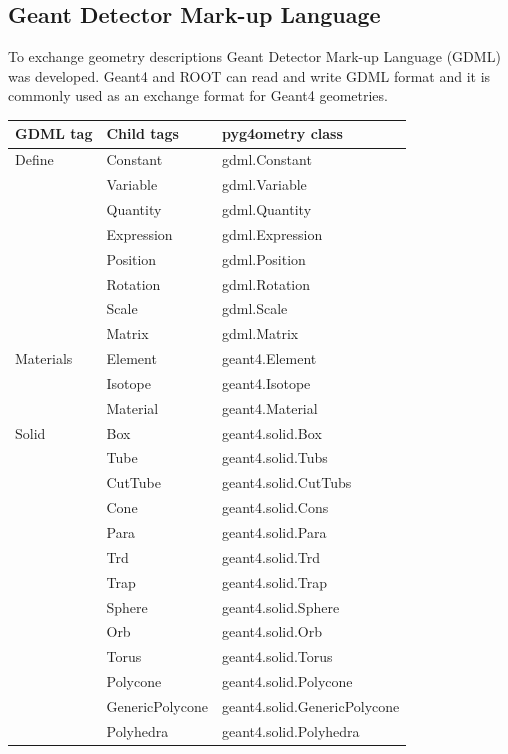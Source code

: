 \documentclass[final,5p,times,twocolumn]{elsarticle}
\begin{document}
\subsection{Geant Detector Mark-up Language} 
To exchange geometry descriptions Geant Detector Mark-up Language (GDML) was developed. Geant4 and ROOT can read and write GDML format and it is commonly
used as an exchange format for Geant4 geometries. 
\begin{table}[hbt!]
\centering
\begin{tabular}{|l|l|l|} \hline
GDML tag 		& Child tags				& pyg4ometry class 				\\ \hline
Define 			& Constant				& gdml.Constant				\\
				& Variable					& gdml.Variable					\\
				& Quantity					& gdml.Quantity				\\
				& Expression 				& gdml.Expression				\\
				& Position					& gdml.Position					\\
				& Rotation					& gdml.Rotation				\\
				& Scale					& gdml.Scale					\\
				& Matrix					& gdml.Matrix					\\ \hline
Materials 			& Element					& geant4.Element				\\
				& Isotope					& geant4.Isotope				\\
				& Material					& geant4.Material				\\ \hline
Solid  			& Box					& geant4.solid.Box				\\
	  			& Tube					& geant4.solid.Tubs				\\
	  			& CutTube				& geant4.solid.CutTubs			\\
	  			& Cone					& geant4.solid.Cons				\\
	  			& Para					& geant4.solid.Para				\\
	  			& Trd					& geant4.solid.Trd				\\
	  			& Trap					& geant4.solid.Trap				\\
	  			& Sphere					& geant4.solid.Sphere			\\
	  			& Orb					& geant4.solid.Orb				\\
	  			& Torus					& geant4.solid.Torus				\\
	  			& Polycone				& geant4.solid.Polycone			\\
	  			& GenericPolycone			& geant4.solid.GenericPolycone	\\
	  			& Polyhedra				& geant4.solid.Polyhedra			\\

\end{tabular}
\end{table}
\end{document}
